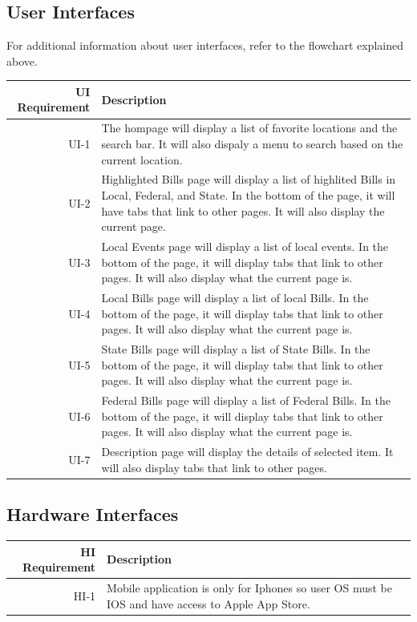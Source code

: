 \documentclass[12pt,oneside,letterpaper]{article}
\begin{document}
\subsection{User Interfaces}
For additional information about user interfaces, refer to the flowchart explained above.
\begin{longtable}{|r|p{3.8in}|}
\hline
UI Requirement & Description \\
\hline
UI-1 & The hompage will display a list of favorite locations and the search bar. It will also dispaly a menu to search based on the current location. \\
\hline
UI-2 & Highlighted Bills page will display a list of highlited Bills in Local, Federal, and State. In the bottom of the page, it will have tabs that link to other pages. It will also display the current page. \\
\hline
UI-3 & Local Events page will display a list of local events. In the bottom of the page, it will display tabs that link to other pages. It will also display what the current page is. \\
\hline
UI-4 & Local Bills page will display a list of local Bills. In the bottom of the page, it will display tabs that link to other pages. It will also display what the current page is.\\
\hline
UI-5 & State Bills page will display a list of State Bills. In the bottom of the page, it will display tabs that link to other pages. It will also display what the current page is.\\
\hline
UI-6 & Federal Bills page will display a list of Federal Bills. In the bottom of the page, it will display tabs that link to other pages. It will also display what the current page is.\\
\hline
UI-7 & Description page will display the details of selected item. It will also display tabs that link to other pages. \\
\hline
\end{longtable}

\subsection{Hardware Interfaces}
\begin{longtable}{|r|p{3.8in}|}
\hline
HI Requirement & Description \\
\hline
HI-1 & Mobile application is only for Iphones so user OS must be IOS and have access to Apple App Store. \\
\hline
\end{longtable}
\end{document}
